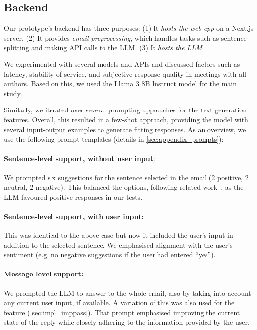 \subsection{Backend}
Our prototype's backend has three purposes: 
(1) It \textit{hosts the web app} on a Next.js server. 
(2) It provides \textit{email preprocessing}, which handles tasks such as sentence-splitting and making API calls to the LLM. 
(3) It \textit{hosts the LLM}. 

We experimented with several models and APIs and discussed factors such as latency, stability of service, and subjective response quality in meetings with all authors. Based on this, we used the Llama 3 8B Instruct \cite{llama3modelcard} model for the main study. 

Similarly, we iterated over several prompting approaches for the text generation features. Overall, this resulted in a few-shot approach, providing the model with several input-output examples to generate fitting responses. 
As an overview, we use the following prompt templates (details in \cref{sec:appendix_prompts}):

\paragraph{Sentence-level support, without user input:}
We prompted six suggestions for the sentence selected in the email (2 positive, 2 neutral, 2 negative). This balanced the options, following related work~\cite{Kannan2016smartreply}, as the LLM favoured positive responses in our tests.

\paragraph{Sentence-level support, with user input:} 
This was identical to the above case but now it included the user's input in addition to the selected sentence. %
We emphasised alignment with the user's sentiment (e.g. no negative suggestions if the user had entered ``yes'').


\paragraph{Message-level support:}
We prompted the LLM to answer to the whole email, also by taking into account any current user input, if available. A variation of this was also used for the \imppass{} feature (\cref{sec:impl_imppass}). That prompt emphasised improving the current state of the reply while closely adhering to the information provided by the user. %
